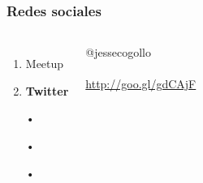 \documentclass{beamer}
\begin{document}
\begin{frame}
\frametitle{Redes sociales}
\begin{columns}[c] %

\begin{enumerate}
\item Meetup
\item \textbf{Twitter}
\item[•]	
\item[•]	
\item[•]	
\end{enumerate}

{\color{blue}@jessecogollo}
\\~\\
{\color{blue}\url{http://goo.gl/gdCAjF}}
\end{columns}
\end{frame}
\end{document}
